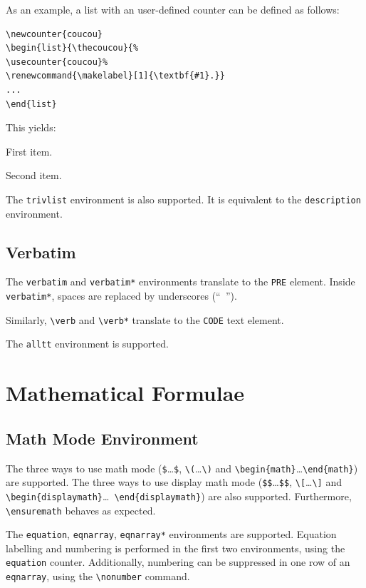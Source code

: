 As an example, a list with an user-defined counter can be defined as
follows:
\begin{verbatim}
\newcounter{coucou}
\begin{list}{\thecoucou}{%
\usecounter{coucou}%
\renewcommand{\makelabel}[1]{\textbf{#1}.}}
...
\end{list}
\end{verbatim}
This yields:
\begin{list}
  {\thecoucou}
  {\renewcommand{\makelabel}[1]{\textbf{#1}.}}
\item First item.
\item Second item.
\end{list}


The \verb+trivlist+ environment is also supported. It is equivalent to
the \verb+description+ environment.

\subsection{Verbatim}

The \verb+verbatim+ and \verb+verbatim*+ environments translate to
the \verb+PRE+ element.
Inside \verb+verbatim*+, spaces are replaced by underscores (``\verb*+ +'').


Similarly, \verb+\verb+ and \verb+\verb*+
translate to the \verb+CODE+ text element.

The \verb+alltt+ environment is supported.

\section{Mathematical Formulae}

\subsection{Math Mode Environment}
The three ways to use math mode (\verb+$+\ldots\verb+$+,
\verb+\(+\ldots\verb+\)+ and
\verb+\begin{math}+\ldots\verb+\end{math}+) are supported.
The three ways to use display math mode (\verb+$$+\ldots\verb+$$+,
\verb+\[+\ldots\verb+\]+ and
\verb+\begin{displaymath}+\ldots\ \verb+\end{displaymath}+) are also
supported.
Furthermore, \verb+\ensuremath+ behaves as expected.


The \verb+equation+, \verb+eqnarray+, \verb+eqnarray*+ environments
are supported.
Equation labelling and numbering is performed in the first two
environments, using the \verb+equation+ counter.
Additionally, numbering can be suppressed in one row of an
\verb+eqnarray+, using the \verb+\nonumber+ command.


